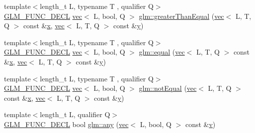 \begin{DoxyCompactItemize}
\item 
{\footnotesize template$<$length\+\_\+t L, typename T , qualifier Q$>$ }\\\mbox{\hyperlink{setup_8hpp_ab2d052de21a70539923e9bcbf6e83a51}{G\+L\+M\+\_\+\+F\+U\+N\+C\+\_\+\+D\+E\+CL}} \mbox{\hyperlink{structglm_1_1vec}{vec}}$<$ L, bool, Q $>$ \mbox{\hyperlink{group__core__func__vector__relational_ga271038c5290184127754bda0ae91a5bd}{glm\+::greater\+Than\+Equal}} (\mbox{\hyperlink{structglm_1_1vec}{vec}}$<$ L, T, Q $>$ const \&\mbox{\hyperlink{_s_d_l__opengl_8h_ad0e63d0edcdbd3d79554076bf309fd47}{x}}, \mbox{\hyperlink{structglm_1_1vec}{vec}}$<$ L, T, Q $>$ const \&\mbox{\hyperlink{_s_d_l__opengl_8h_a1675d9d7bb68e1657ff028643b4037e3}{y}})
\item 
{\footnotesize template$<$length\+\_\+t L, typename T , qualifier Q$>$ }\\\mbox{\hyperlink{setup_8hpp_ab2d052de21a70539923e9bcbf6e83a51}{G\+L\+M\+\_\+\+F\+U\+N\+C\+\_\+\+D\+E\+CL}} \mbox{\hyperlink{structglm_1_1vec}{vec}}$<$ L, bool, Q $>$ \mbox{\hyperlink{group__core__func__vector__relational_ga774f9e3a93c913f1e7c215a549707d59}{glm\+::equal}} (\mbox{\hyperlink{structglm_1_1vec}{vec}}$<$ L, T, Q $>$ const \&\mbox{\hyperlink{_s_d_l__opengl_8h_ad0e63d0edcdbd3d79554076bf309fd47}{x}}, \mbox{\hyperlink{structglm_1_1vec}{vec}}$<$ L, T, Q $>$ const \&\mbox{\hyperlink{_s_d_l__opengl_8h_a1675d9d7bb68e1657ff028643b4037e3}{y}})
\item 
{\footnotesize template$<$length\+\_\+t L, typename T , qualifier Q$>$ }\\\mbox{\hyperlink{setup_8hpp_ab2d052de21a70539923e9bcbf6e83a51}{G\+L\+M\+\_\+\+F\+U\+N\+C\+\_\+\+D\+E\+CL}} \mbox{\hyperlink{structglm_1_1vec}{vec}}$<$ L, bool, Q $>$ \mbox{\hyperlink{group__core__func__vector__relational_gac5a72a973c81dc697dd8bb5d218e8251}{glm\+::not\+Equal}} (\mbox{\hyperlink{structglm_1_1vec}{vec}}$<$ L, T, Q $>$ const \&\mbox{\hyperlink{_s_d_l__opengl_8h_ad0e63d0edcdbd3d79554076bf309fd47}{x}}, \mbox{\hyperlink{structglm_1_1vec}{vec}}$<$ L, T, Q $>$ const \&\mbox{\hyperlink{_s_d_l__opengl_8h_a1675d9d7bb68e1657ff028643b4037e3}{y}})
\item 
{\footnotesize template$<$length\+\_\+t L, qualifier Q$>$ }\\\mbox{\hyperlink{setup_8hpp_ab2d052de21a70539923e9bcbf6e83a51}{G\+L\+M\+\_\+\+F\+U\+N\+C\+\_\+\+D\+E\+CL}} bool \mbox{\hyperlink{group__core__func__vector__relational_gadcc289349a96ef7642b14bc151ee4ae8}{glm\+::any}} (\mbox{\hyperlink{structglm_1_1vec}{vec}}$<$ L, bool, Q $>$ const \&\mbox{\hyperlink{_s_d_l__opengl_8h_a10a82eabcb59d2fcd74acee063775f90}{v}})

\end{DoxyCompactItemize}
